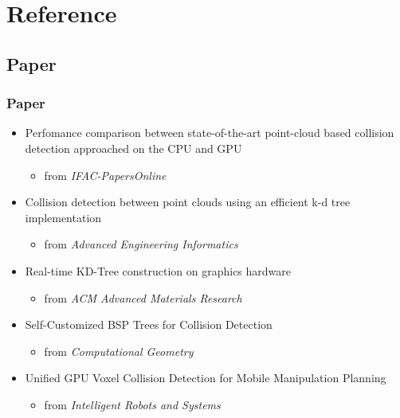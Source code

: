 \documentclass{beamer}
\begin{document}
\section{Reference}

\subsection{Paper}
	\begin{frame}
	\frametitle{Paper}
	\begin{itemize}
		\item Perfomance comparison between state-of-the-art point-cloud based collision detection approached on the CPU and GPU
			\begin{itemize}
				\item from \it{IFAC-PapersOnline}
			\end{itemize}
		\item Collision detection between point clouds using an efficient k-d tree implementation
			\begin{itemize}
				\item from \it{Advanced Engineering Informatics}
			\end{itemize}
		\item Real-time KD-Tree construction on graphics hardware
			\begin{itemize}
				\item from \it{ACM Advanced Materials Research}
			\end{itemize}
		\item Self-Customized BSP Trees for Collision Detection
			\begin{itemize}
				\item from \it{Computational Geometry}
			\end{itemize}
		\item Unified GPU Voxel Collision Detection for Mobile Manipulation Planning
			\begin{itemize}
				\item from \it{Intelligent Robots and Systems}
			\end{itemize}
	\end{itemize}
	\end{frame}

\end{document}
